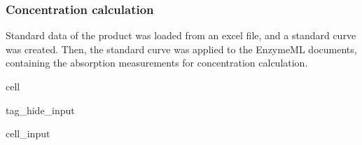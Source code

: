 \documentclass[letterpaper,10pt,english]{jupyterBook}
\begin{document}
\subsubsection{Concentration calculation}
\label{\detokenize{scenarios/glycosidase_inhibition:concentration-calculation}}
\sphinxAtStartPar
Standard data of the product was loaded from an excel file, and a standard curve was created. Then, the standard curve was applied to the EnzymeML documents, containing the absorption measurements for concentration calculation.

\begin{sphinxuseclass}{cell}
\begin{sphinxuseclass}{tag_hide_input}\begin{sphinxVerbatimInput}

\begin{sphinxuseclass}{cell_input}
\begin{sphinxVerbatim}[commandchars=\\\{\}]
  


  
       


   
     
\end{sphinxVerbatim}

\end{sphinxuseclass}\end{sphinxVerbatimInput}
\begin{sphinxVerbatimOutput}


\end{sphinxVerbatimOutput}
\end{sphinxuseclass}
\end{sphinxuseclass}
\end{document}
